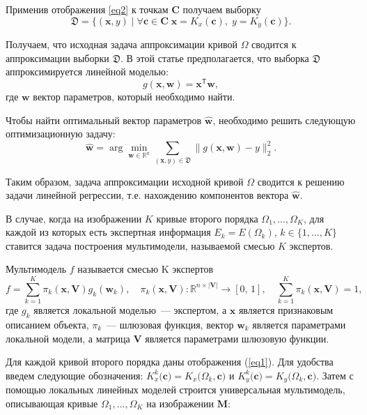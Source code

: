 Применив отображения \eqref{eq2} к точкам $\mathbf{C}$ получаем выборку
\[
\label{eq4}
    \mathfrak{D} = \{(\mathbf{x}, y) \; | \; \forall \mathbf{c} \in \mathbf{C} \; \mathbf{x} = K_x(\mathbf{c}), \; y = K_y(\mathbf{c}) \}.
\]

Получаем, что исходная задача аппроксимации кривой $\Omega$ сводится к аппроксимации выборки $\mathfrak{D} $. В этой статье предполагается, что выборка $\mathfrak{D}$ аппроксимируется линейной моделью:
\[
	g(\mathbf{x}, \mathbf{w}) = \mathbf{x}^\mathsf{T} \mathbf{w},
\] 
где $\mathbf{w}$ вектор параметров, который необходимо найти.

Чтобы найти оптимальный вектор параметров $\hat{\mathbf{w}}$, необходимо решить следующую оптимизационную задачу:
\[
	\hat{\mathbf{w}} = \arg\min_{\mathbf{w}\in\mathbb{R}^n} \sum_{\left(\mathbf{x}, y\right) \in \mathfrak{D}}\|g(\mathbf{x}, \mathbf{w}) - y \|_2^2.
\] 

Таким образом, задача аппроксимации исходной кривой $\Omega$ сводится к решению задачи линейной регрессии, т.е. нахождению компонентов вектора $\hat{\mathbf{w}}$.

В случае, когда на изображении $K$ кривые второго порядка $\Omega_1, \dots, \Omega_K $, для каждой из которых есть экспертная информация $E_k = E(\Omega_k), \, k \in \{ 1, \dots, K \} $ ставится задача построения мультимодели, называемой смесью $ K $ экспертов.

\begin{definition}
Мультимодель $ f $ называется смесью K экспертов
\[
	f = \sum\limits_{k = 1}^{K}\pi_k(\mathbf{x}, \mathbf{V})g_k(\mathbf{w}_k),  \quad \pi_k(\mathbf{x}, \mathbf{V}): \mathbb{R}^{n\times |\mathbf{V}|} \rightarrow [0, \, 1], \quad \sum\limits_{k = 1}^{K}\pi_k(\mathbf{x}, \mathbf{V}) = 1, 
\]
где $g_k$ является локальной моделью~--- экспертом, а $\mathbf{x}$ является признаковым описанием объекта, $\pi_k$~--- шлюзовая функция, вектор $\mathbf{w}_k$ является параметрами локальной модели, а матрица $\mathbf{V}$ является параметрами шлюзовую функции.
\end{definition}

Для каждой кривой второго порядка даны отображения (\ref{eq1}). Для удобства введем следующие обозначения: $ K_x^k \bigr(\mathbf{c} \bigr) = K_x \bigr (\Omega_k, \mathbf{c} \bigr) $ и $K_y^k \bigr (\mathbf{c}\bigr) = K_y\bigr(\Omega_k, \mathbf{c}\bigr)$.
Затем с помощью локальных линейных моделей строится универсальная мультимодель, описывающая кривые $\Omega_1, \dots, \Omega_K$ на изображении $\mathbf{M}$:

